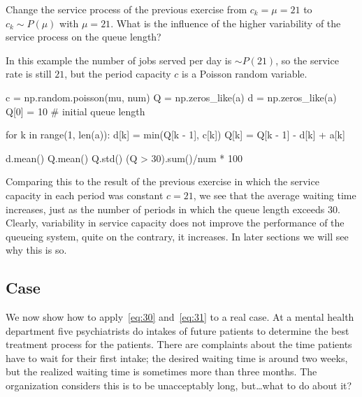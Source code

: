 \begin{exercise}
  Change the service process of the previous exercise from $c_k =\mu=21$ to $c_k\sim P(\mu)$ with $\mu=21$. What is the influence of the higher variability of the service process on the queue length? 
  \begin{solution}
In this  example the number of jobs served per day is $\sim P(21)$, so the service rate is
still $21$, but the period capacity $c$ is a Poisson random variable. 

\begin{pyconsole}
c = np.random.poisson(mu, num)
Q = np.zeros_like(a)
d = np.zeros_like(a)
Q[0] = 10  # initial queue length

for k in range(1, len(a)):
    d[k] = min(Q[k - 1], c[k])
    Q[k] = Q[k - 1] - d[k] + a[k]

d.mean()
Q.mean()
Q.std()
(Q > 30).sum()/num * 100
\end{pyconsole}

Comparing this to the result of the previous exercise in which the service capacity in each period was constant $c=21$, we see that the average waiting time increases, just as the number of periods in which the queue length exceeds 30.
Clearly, variability in service capacity does not improve the performance of the queueing system, quite on the contrary, it increases.
In later sections we will see why this is so.
  \end{solution}
\end{exercise}

\subsection*{Case}
\label{sec:case}



We now show how to apply~\eqref{eq:30} and~\eqref{eq:31} to a real case. At a mental health department five psychiatrists do intakes of future
patients to determine the best treatment process for the patients.
There are complaints about the time patients have to wait for their
first intake; the desired waiting time is around two weeks, but the
realized waiting time is sometimes more than three months. The
organization considers this is to be unacceptably long, but\ldots what to do about it?

